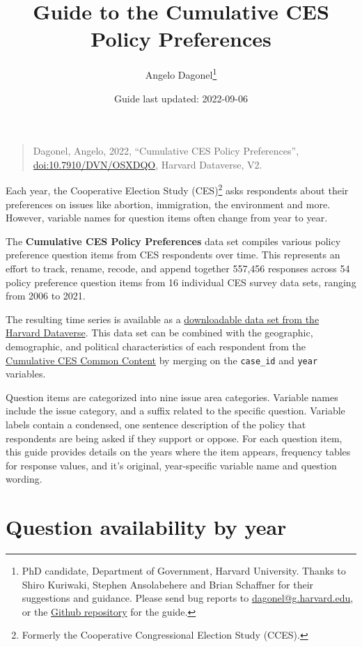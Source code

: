\documentclass[
  12pt]{article}
\title{\Large Guide to the Cumulative CES Policy Preferences}
\author{Angelo Dagonel\footnote{PhD candidate, Department of Government,
  Harvard University. Thanks to Shiro Kuriwaki, Stephen Ansolabehere and
  Brian Schaffner for their suggestions and guidance. Please send bug
  reports to \url{dagonel@g.harvard.edu}, or the
  \href{https://github.com/psjello/cumulative_cces_policy_preferences}{Github
  repository} for the guide.}}
\date{Guide last updated: 2022-09-06}
\begin{document}
\maketitle

\begin{quote}
Dagonel, Angelo, 2022, ``Cumulative CES Policy Preferences'',
\href{https://dataverse.harvard.edu/dataset.xhtml?persistentId=doi:10.7910/DVN/OSXDQO}{\url{doi:10.7910/DVN/OSXDQO}},
Harvard Dataverse, V2.
\end{quote}

\bigskip

Each year, the Cooperative Election Study (CES)\footnote{Formerly the
  Cooperative Congressional Election Study (CCES).} asks respondents
about their preferences on issues like abortion, immigration, the
environment and more. However, variable names for question items often
change from year to year.

\medskip

The \textbf{Cumulative CES Policy Preferences} data set compiles various
policy preference question items from CES respondents over time. This
represents an effort to track, rename, recode, and append together
557,456 responses across 54 policy preference question items from 16
individual CES survey data sets, ranging from 2006 to 2021.

\medskip

The resulting time series is available as a
\href{https://dataverse.harvard.edu/dataset.xhtml?persistentId=doi:10.7910/DVN/OSXDQO}{downloadable
data set from the Harvard Dataverse}. This data set can be combined with
the geographic, demographic, and political characteristics of each
respondent from the
\href{https://dataverse.harvard.edu/dataset.xhtml?persistentId=doi:10.7910/DVN/II2DB6}{Cumulative
CES Common Content} by merging on the \texttt{case\_id} and
\texttt{year} variables.

\medskip

Question items are categorized into nine issue area categories. Variable
names include the issue category, and a suffix related to the specific
question. Variable labels contain a condensed, one sentence description
of the policy that respondents are being asked if they support or
oppose. For each question item, this guide provides details on the years
where the item appears, frequency tables for response values, and it's
original, year-specific variable name and question wording.

\newpage

\hypertarget{question-availability-by-year}{%
\section{Question availability by
year}\label{question-availability-by-year}}
\end{document}
